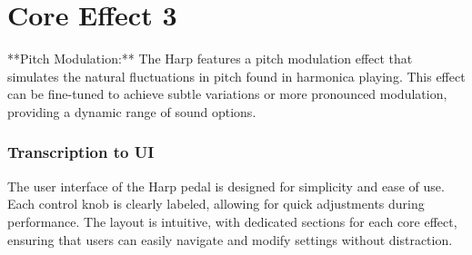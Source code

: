 \chapter{Core Effect 3}

**Pitch Modulation:**  
The Harp features a pitch modulation effect that simulates the natural fluctuations in pitch found in harmonica playing. This effect can be fine-tuned to achieve subtle variations or more pronounced modulation, providing a dynamic range of sound options.

\subsection{Transcription to UI}
The user interface of the Harp pedal is designed for simplicity and ease of use. Each control knob is clearly labeled, allowing for quick adjustments during performance. The layout is intuitive, with dedicated sections for each core effect, ensuring that users can easily navigate and modify settings without distraction.
